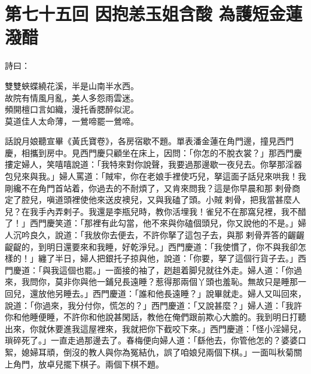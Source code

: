 
\chapter*{第七十五回 因抱恙玉姐含酸 為護短金蓮潑醋}


詩曰：

\begin{myquote} 
雙雙蛺蝶繞花溪，半是山南半水西。\\故院有情風月亂，美人多怨雨雲迷。\\頻開檀口言如織，漫托香腮醉似泥。\\莫道佳人太命薄，一鶯啼罷一鶯啼。
\end{myquote} 

話說月娘聽宣畢《黃氏寶卷》，各房宿歇不題。單表潘金蓮在角門邊，撞見西門慶，相攜到房中。見西門慶只顧坐在床上，{}因問：「你怎的不脫衣裳？」那西門慶摟定婦人，笑嘻嘻說道：「我特來對你說聲，我要過那邊歇一夜兒去。你拏那淫器包兒來與我。」婦人罵道：「賊牢，你在老娘手裡使巧兒，拏這面子話兒來哄我！{}我剛纔不在角門首站着，你過去的不耐煩了，又肯來問我？這是你早晨和那𢱉剌骨商定了腔兒，嗔道頭裡使他來送皮襖兒，又與我磕了頭。小賊𢱉剌骨，把我當甚麼人兒？在我手內弄剌子。我還是李瓶兒時，教你活埋我！{}雀兒不在那窩兒裡，我不醋了！」{}西門慶笑道：「那裡有此勾當，他不來與你磕個頭兒，你又說他的不是。」婦人沉吟良久，說道：「我放你去便去，{}不許你拏了這包子去，{}與那𢱉剌骨弄答的齷齷齪齪的，到明日還要來和我睡，好乾淨兒。」{}西門慶道：「我使慣了，你不與我卻怎樣的！」纏了半日，婦人把銀托子掠與他，說道：「你要，拏了這個行貨子去。」西門慶道：「與我這個也罷。」一面接的袖了，趔趄着脚兒就往外走。婦人道：「你過來，我問你，莫非你與他一鋪兒長遠睡？惹得那兩個丫頭也羞恥。無故只是睡那一回兒，還放他另睡去。」西門慶道：「誰和他長遠睡？」說畢就走。婦人又叫回來，說道：「你過來，我分付你，慌怎的？」{}西門慶道：「又說甚麼？」婦人道：「我許你和他睡便睡，不許你和他說甚閑話，教他在俺們跟前欺心大膽的。我到明日打聽出來，你就休要進我這屋裡來，我就把你下截咬下來。」{}西門慶道：「怪小淫婦兒，瑣碎死了。」一直走過那邊去了。春梅便向婦人道：「繇他去，你管他怎的？婆婆口絮，媳婦耳頑，倒沒的教人與你為冤結仇，{}誤了咱娘兒兩個下棋。」一面叫秋菊關上角門，放卓兒擺下棋子。兩個下棋不題。

